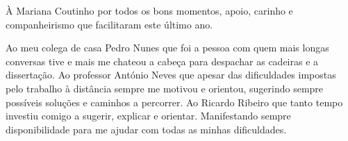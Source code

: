        \TEXT{}
       {À Mariana Coutinho por todos os bons momentos, apoio, carinho e companheirismo que facilitaram este último ano.}

       \TEXT{}
       {Ao meu colega de casa Pedro Nunes que foi a pessoa com quem mais longas conversas tive e mais me chateou a cabeça para despachar as cadeiras e a dissertação. 
       }
       \TEXT{}
       {Ao professor António Neves que apesar das dificuldades impostas pelo trabalho à distância sempre me motivou e orientou, sugerindo sempre possíveis soluções e caminhos a percorrer. }
       \TEXT{}
       {Ao Ricardo Ribeiro que tanto tempo investiu comigo a sugerir, explicar e orientar. Manifestando sempre disponibilidade para me ajudar com todas as minhas dificuldades. }
\EndTitlePage
\titlepage\ \endtitlepage %



